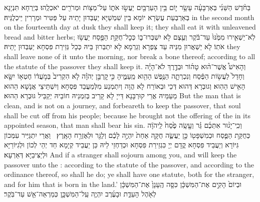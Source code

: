 {בַּחֹ֨דֶשׁ הַשֵּׁנִ֜י בְּאַרְבָּעָ֨ה עָשָׂ֥ר י֛וֹם בֵּ֥ין הָעַרְבַּ֖יִם יַעֲשׂ֣וּ אֹת֑וֹ עַל־מַצּ֥וֹת וּמְרֹרִ֖ים יֹאכְלֻֽהוּ׃}
{בְּיַרְחָא תִּנְיָנָא בְּאַרְבְּעַת עֶשְׂרָא יוֹמָא בֵּין שִׁמְשַׁיָּא יַעְבְּדוּן יָתֵיהּ עַל פַּטִּיר וּמְרָרִין יֵיכְלֻנֵּיהּ׃}
{in the second month on the fourteenth day at dusk they shall keep it; they shall eat it with unleavened bread and bitter herbs;}{}
{לֹֽא־יַשְׁאִ֤ירוּ מִמֶּ֙נּוּ֙ עַד־בֹּ֔קֶר וְעֶ֖צֶם לֹ֣א יִשְׁבְּרוּ־ב֑וֹ כְּכׇל־חֻקַּ֥ת הַפֶּ֖סַח יַעֲשׂ֥וּ אֹתֽוֹ׃}
{לָא יַשְׁאֲרוּן מִנֵּיהּ עַד צַפְרָא וְגַרְמָא לָא יִתְבְּרוּן בֵּיהּ כְּכָל גְּזֵירַת פִּסְחָא יַעְבְּדוּן יָתֵיהּ׃}
{they shall leave none of it unto the morning, nor break a bone thereof; according to all the statute of the passover they shall keep it.}{}
{וְהָאִישׁ֩ אֲשֶׁר־ה֨וּא טָה֜וֹר וּבְדֶ֣רֶךְ לֹא־הָיָ֗ה וְחָדַל֙ לַעֲשׂ֣וֹת הַפֶּ֔סַח וְנִכְרְתָ֛ה הַנֶּ֥פֶשׁ הַהִ֖וא מֵֽעַמֶּ֑יהָ כִּ֣י \legarmeh  קׇרְבַּ֣ן יְהֹוָ֗ה לֹ֤א הִקְרִיב֙ בְּמֹ֣עֲד֔וֹ חֶטְא֥וֹ יִשָּׂ֖א הָאִ֥ישׁ הַהֽוּא׃}
{וְגוּבְרָא דְּהוּא דְּכֵי וּבְאוֹרַח לָא הֲוָה וְיִתְמְנַע מִלְּמַעֲבַד פִּסְחָא וְיִשְׁתֵּיצֵי אֲנָשָׁא הַהוּא מֵעַמֵּיהּ אֲרֵי קוּרְבָּנָא דַּייָ לָא קָרֵיב בְּזִמְנֵיהּ חוֹבֵיהּ יְקַבֵּיל גּוּבְרָא הַהוּא׃}
{But the man that is clean, and is not on a journey, and forbeareth to keep the passover, that soul shall be cut off from his people; because he brought not the offering of the \lord\space in its appointed season, that man shall bear his sin.}{}
{וְכִֽי־יָג֨וּר אִתְּכֶ֜ם גֵּ֗ר וְעָ֤שָֽׂה פֶ֙סַח֙ לַֽיהֹוָ֔ה כְּחֻקַּ֥ת הַפֶּ֛סַח וּכְמִשְׁפָּט֖וֹ כֵּ֣ן יַעֲשֶׂ֑ה חֻקָּ֤ה אַחַת֙ יִהְיֶ֣ה לָכֶ֔ם וְלַגֵּ֖ר וּלְאֶזְרַ֥ח הָאָֽרֶץ׃ \setuma 
{}}
{וַאֲרֵי יִתְגַּיַּיר עִמְּכוֹן גִּיּוֹרָא וְיַעֲבֵיד פִּסְחָא קֳדָם יְיָ כִּגְזֵירַת פִּסְחָא וּכְדַחְזֵי לֵיהּ כֵּן יַעֲבֵיד קְיָמָא חַד יְהֵי לְכוֹן וּלְגִיּוֹרַיָּא וּלְיַצִּיבַיָּא דְּאַרְעָא׃}
{And if a stranger shall sojourn among you, and will keep the passover unto the \lord: according to the statute of the passover, and according to the ordinance thereof, so shall he do; ye shall have one statute, both for the stranger, and for him that is born in the land.’}{}
{וּבְיוֹם֙ הָקִ֣ים אֶת־הַמִּשְׁכָּ֔ן כִּסָּ֤ה הֶֽעָנָן֙ אֶת־הַמִּשְׁכָּ֔ן לְאֹ֖הֶל הָעֵדֻ֑ת וּבָעֶ֜רֶב יִהְיֶ֧ה עַֽל־הַמִּשְׁכָּ֛ן כְּמַרְאֵה־אֵ֖שׁ עַד־בֹּֽקֶר׃
}
